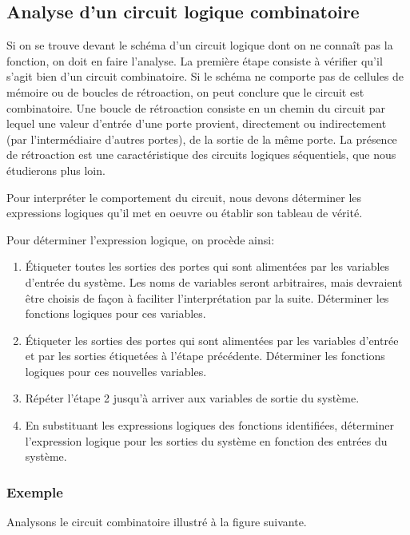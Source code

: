 \documentclass[11pt]{article}
\begin{document}
\subsection{Analyse d'un circuit logique combinatoire}
\label{sec:org363d233}

Si on se trouve devant le schéma d'un circuit logique dont on ne
connaît pas la fonction, on doit en faire l'analyse. La première étape
consiste à vérifier qu'il s'agit bien d'un circuit combinatoire. Si le
schéma ne comporte pas de cellules de mémoire ou de boucles de
rétroaction, on peut conclure que le circuit est combinatoire. Une
boucle de rétroaction consiste en un chemin du circuit par
lequel une valeur d'entrée d'une porte provient, directement ou
indirectement (par l'intermédiaire d'autres portes), de la sortie de
la même porte. La présence de rétroaction est une caractéristique des
circuits logiques séquentiels, que nous étudierons plus loin.

Pour interpréter le comportement du circuit, nous devons déterminer
les expressions logiques qu'il met en oeuvre ou établir son tableau de
vérité.

Pour déterminer l'expression logique, on procède ainsi:
\begin{enumerate}
\item Étiqueter toutes les sorties des portes qui sont alimentées par les
variables d'entrée du système. Les noms de variables seront
arbitraires, mais devraient être choisis de façon à faciliter
l'interprétation par la suite. Déterminer les fonctions logiques
pour ces variables.
\item Étiqueter les sorties des portes qui sont alimentées par les
variables d'entrée et par les sorties étiquetées à l'étape
précédente. Déterminer les fonctions logiques pour ces nouvelles
variables.
\item Répéter l'étape 2 jusqu'à arriver aux variables de sortie du système.
\item En substituant les expressions logiques des fonctions identifiées,
déterminer l'expression logique pour les sorties du système en
fonction des entrées du système.
\end{enumerate}

\subsubsection{Exemple}
\label{sec:org553be6a}

Analysons le circuit combinatoire illustré à la figure
suivante.
\end{document}
